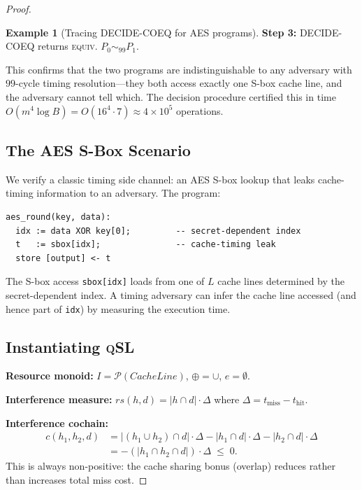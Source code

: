 \documentclass[acmsmall,sigplan,anonymous,review,screen]{acmart}
\theoremstyle{plain}
\theoremstyle{definition}
\newtheorem{example}[theorem]{Example}
\newcommand{\qSL}{\textsc{qSL}\xspace}
\newcommand{\rs}{\mathit{rs}}
\begin{document}
\begin{proof}
\begin{example}[Tracing DECIDE-COEQ for AES programs]
  \textbf{Step 3:} DECIDE-COEQ returns \textsc{equiv}.  $P_0 \sim_{99} P_1$.

  This confirms that the two programs are indistinguishable to any
  adversary with $99$-cycle timing resolution---they both access exactly
  one S-box cache line, and the adversary cannot tell which.  The decision
  procedure certified this in time $O(m^4 \log B) = O(16^4 \cdot 7) \approx
  4 \times 10^5$ operations.
\end{example}

\subsection{The AES S-Box Scenario}
\label{sec:casestudy:aes}

We verify a classic timing side channel: an AES S-box lookup that leaks
cache-timing information to an adversary.  The program:

\begin{lstlisting}[frame=single]
aes_round(key, data):
  idx := data XOR key[0];         -- secret-dependent index
  t   := sbox[idx];               -- cache-timing leak
  store [output] <- t
\end{lstlisting}

The S-box access \texttt{sbox[idx]} loads from one of $L$ cache lines
determined by the secret-dependent index.  A timing adversary can
infer the cache line accessed (and hence part of \texttt{idx}) by
measuring the execution time.

\subsection{Instantiating \qSL}
\label{sec:casestudy:inst}

\textbf{Resource monoid:}
$I = \mathcal{P}(\mathit{CacheLine})$, $\oplus = \cup$, $e = \emptyset$.

\textbf{Interference measure:}
$\rs(h, d) = |h \cap d| \cdot \Delta$
where $\Delta = t_{\mathrm{miss}} - t_{\mathrm{hit}}$.

\textbf{Interference cochain:}
\begin{align*}
  c(h_1, h_2, d) &= |(h_1 \cup h_2) \cap d| \cdot \Delta
                    - |h_1 \cap d| \cdot \Delta - |h_2 \cap d| \cdot \Delta \\
  &= -(|h_1 \cap h_2 \cap d|) \cdot \Delta \;\leq\; 0.
\end{align*}
This is always non-positive: the cache sharing bonus (overlap) reduces
rather than increases total miss cost.


\end{proof}
\end{document}
